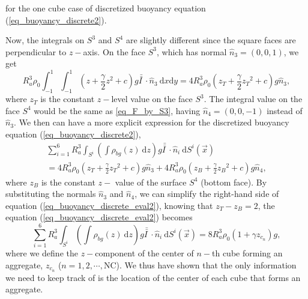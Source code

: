 for the one cube case of discretized buoyancy equation (\ref{eq_buoyancy_discrete2}).
\par
Now, the integrals on $S^3$ and $S^4$ are slightly different since the square faces are perpendicular to $z-$axis. On the face $S^3$, which has normal $\hat{n}_3 = (0,0,1)$, we get
\begin{equation}
	R_a^3
\rho_0\int_{-1}^{1} \int_{-1}^{1}
  	\left( 
  	 z + \frac{\gamma}{2}{z}^2 + c 
 	\right)g  \bar{\bar{I \ }}  \cdot
 	\hat{n}_3 \ 
	\textrm{d}x  \textrm{d}y 
	= 4 R_a^3 \rho_0 \left( z_T + \frac{\gamma}{2} {z_T}^{2} +c \right) g \hat{n}_3,
	\label{eq_F_by_S3}
\end{equation} 
where $z_T$ is the constant $z-$level value on the face $S^3$. The integral value on the face $S^4$ would be the same as \ref{eq_F_by_S3}, having $\hat{n}_4 = (0,0,-1)$ instead of $\hat{n}_3$. We then can have a more explicit expression for the discretized buoyancy equation (\ref{eq_buoyancy_discrete2}),
\begin{align}
	\sum_{i=1}^{6} R_a^3
	 \int_{S^i} \left( 
	   \int  {\rho_{bg}} (z)  \ \textrm{d}z 
	 \right) g \bar{\bar{I \ }}  \cdot
	\hat{n}_i \ \textrm{d}S^i (\vec{x})
	\nonumber 
	\\
	= 4 R_a^3 \rho_0 \left( z_T + \frac{\gamma}{2} {z_T}^{2} +c \right) g \hat{n}_3
	+ 4R_a^3 \rho_0 \left( z_B + \frac{\gamma}{2} {z_B}^{2} + c \right) g \hat{n}_4,
\label{eq_buoyancy_discrete_eval2}
\end{align}
where $z_B$ is the constant $z-$ value of the surface $S^4$ (bottom face). By substituting the normals $\hat{n}_3$ and $\hat{n}_4$, we can simplify the right-hand side of equation (\ref{eq_buoyancy_discrete_eval2}), knowing that $z_T - z_B = 2$, the equation (\ref{eq_buoyancy_discrete_eval2}) becomes 
\begin{equation}
	\sum_{i=1}^{6} R_a^3
	\int_{S^i} \left( 
	  \int  {\rho_{bg}} (z)  \ \textrm{d}z 
	\right) g \bar{\bar{I \ }}  \cdot
   \hat{n}_i \ \textrm{d}S^i (\vec{x})
= 8 R_a^3 \rho_0 \left( 1+ \gamma z_{c_n} \right) g, 
\label{eq_buoyancy_z_eval2}
\end{equation}
where we define the $z-$component of the center of $n-$th cube forming an aggregate, $z_{c_n}$ ($ n = 1, 2, \cdots, $NC).
We thus have shown that the only information we need to keep track of is the location of the center of each cube that forms an aggregate.
%
